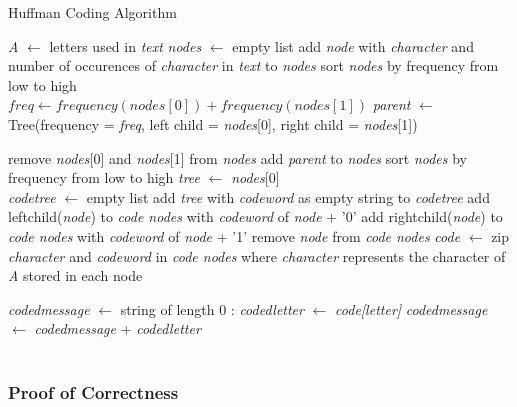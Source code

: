 \documentclass[paper=a4, fontsize=10pt]{article} %
\numberwithin{equation}{section} %
\numberwithin{figure}{section} %
\numberwithin{table}{section} %
\begin{document}
\begin{algorithm}[h]
\caption{Huffman Coding Algorithm}\label{alg:huffman}
\begin{algorithmic}[1]
\State \textit{A} $\gets$ letters used in \textit{text}
\State \textit{nodes} $\gets$ empty list
\State add \textit{node} with \textit{character} and number of occurences of \textit{character} in \textit{text} to \textit{nodes}
\EndFor
\State sort \textit{nodes} by frequency from low to high
\EndProcedure
\\
\State $freq \gets frequency(nodes[0]) + frequency(nodes[1])$
\State \textit{parent} $\gets$ Tree(frequency = \textit{freq}, left child =  \textit{nodes}[0], right child = \textit{nodes}[1])

\State remove \textit{nodes}[0] and \textit{nodes}[1] from \textit{nodes}
\State add \textit{parent} to \textit{nodes}
\State sort \textit{nodes} by frequency from low to high
\EndWhile
\State \textit{tree} $\gets$ \textit{nodes}[0]
\EndProcedure
\\
\State \textit{codetree} $\gets$ empty list
\State add \textit{tree} with \textit{codeword} as empty string to \textit{codetree}
\State add leftchild(\textit{node}) to \textit{code nodes} with \textit{codeword} of \textit{node} + '0'
\State add rightchild(\textit{node}) to \textit{code nodes} with \textit{codeword} of \textit{node} + '1'
\State remove \textit{node} from \textit{code nodes}
\EndIf
\EndFor
\State \textit{code} $\gets$ zip \textit{character} and \textit{codeword} in \textit{code nodes} where \textit{character} represents the character of \textit{A} stored in each node
\EndProcedure
\\

\State \textit{codedmessage} $\gets$ string of length 0
:
\State \textit{codedletter} $\gets$ \textit{code[letter]}
\State \textit{codedmessage} $\gets$ \textit{codedmessage} + \textit{codedletter}
\EndFor
\\
\\
\EndProcedure
\end{algorithmic}
\end{algorithm}

\pagebreak

\subsubsection{Proof of Correctness}
\end{document}
